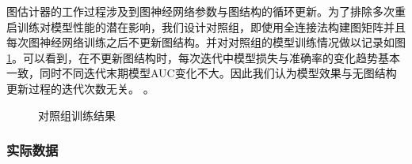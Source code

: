 图估计器的工作过程涉及到图神经网络参数与图结构的循环更新。为了排除多次重启训练对模型性能的潜在影响，我们设计对照组，即使用全连接法构建图矩阵并且每次图神经网络训练之后不更新图结构。并对对照组的模型训练情况做以记录如图\ref{fig:baseline_train}。可以看到，在不更新图结构时，每次迭代中模型损失与准确率的变化趋势基本一致，同时不同迭代末期模型AUC变化不大。因此我们认为模型效果与无图结构更新过程的迭代次数无关。
。
\begin{figure}[ht]
\centering
{}
\caption{对照组训练结果}
\label{fig:baseline_train}
\end{figure}

\subsubsection{实际数据}

